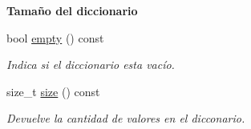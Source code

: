 \begin{Indent}{\bf Tamaño del diccionario}\par
\begin{DoxyCompactItemize}
\item 
bool \hyperlink{classaed2_1_1map_af5320ca0a7df4d16015441d5d055a7ee_af5320ca0a7df4d16015441d5d055a7ee}{empty} () const 
\begin{DoxyCompactList}\small\item\em Indica si el diccionario esta vacío. \end{DoxyCompactList}\item 
size\+\_\+t \hyperlink{classaed2_1_1map_a89f2613f926ac13293eafe65889d6021_a89f2613f926ac13293eafe65889d6021}{size} () const 
\begin{DoxyCompactList}\small\item\em Devuelve la cantidad de valores en el dicconario. \end{DoxyCompactList}\end{DoxyCompactItemize}
\end{Indent}
